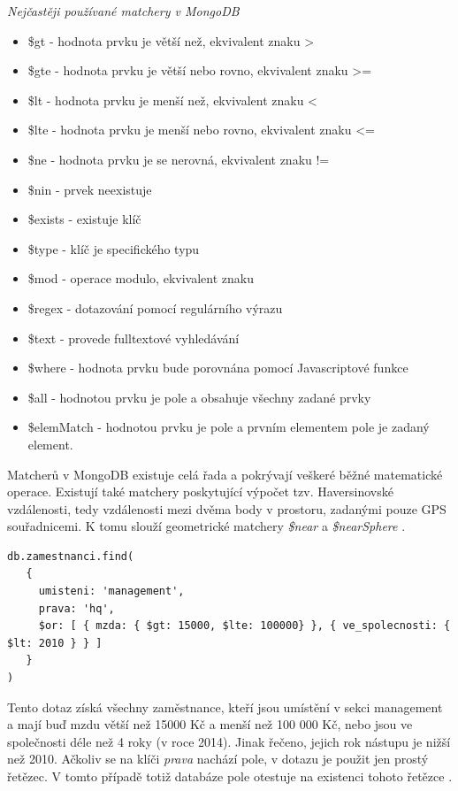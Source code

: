 \noindent\emph{Nejčastěji používané matchery v MongoDB}
\begin{itemize}
\item \$gt - hodnota prvku je větší než, ekvivalent znaku >
\item \$gte - hodnota prvku je větší nebo rovno, ekvivalent znaku >=
\item \$lt - hodnota prvku je menší než, ekvivalent znaku <
\item \$lte - hodnota prvku je menší nebo rovno, ekvivalent znaku <=
\item \$ne - hodnota prvku je se nerovná, ekvivalent znaku !=
\item \$nin - prvek neexistuje
\item \$exists - existuje klíč
\item \$type - klíč je specifického typu
\item \$mod - operace modulo, ekvivalent znaku %
\item \$regex - dotazování pomocí regulárního výrazu
\item \$text - provede fulltextové vyhledávání
\item \$where - hodnota prvku bude porovnána pomocí Javascriptové funkce
\item \$all - hodnotou prvku je pole a obsahuje všechny zadané prvky
\item \$elemMatch - hodnotou prvku je pole a prvním elementem pole je zadaný element.
\end{itemize}

Matcherů v MongoDB existuje celá řada a pokrývají veškeré běžné matematické operace. Existují také matchery poskytující výpočet tzv. Haversinovské vzdálenosti, tedy vzdálenosti mezi dvěma body v prostoru, zadanými pouze GPS souřadnicemi. K tomu slouží geometrické matchery \emph{\$near} a \emph{\$nearSphere} \cite{mongoDocs}.

\begin{lstlisting}[caption=Ukázka složitějšího dotazu na MongoDB databázi]
db.zamestnanci.find(
   {
     umisteni: 'management',
     prava: 'hq',
     $or: [ { mzda: { $gt: 15000, $lte: 100000} }, { ve_spolecnosti: { $lt: 2010 } } ]
   }
)
\end{lstlisting}

Tento dotaz získá všechny zaměstnance, kteří jsou umístění v sekci management a mají buď mzdu větší než 15000 Kč a menší než 100 000 Kč, nebo jsou ve společnosti déle než 4 roky (v roce 2014). Jinak řečeno, jejich rok nástupu je nižší než 2010. Ačkoliv se na klíči \emph{prava} nachází pole, v dotazu je použit jen prostý řetězec. V tomto případě totiž databáze pole otestuje na existenci tohoto řetězce \cite{mongoDocs}.

